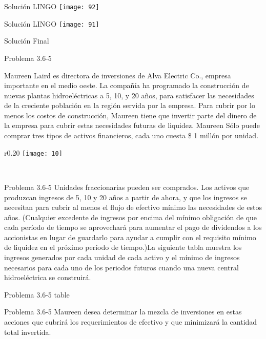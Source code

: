 \documentclass{beamer}
\begin{document}
\begin{frame}[fragile]{Solución LINGO}
    \texttt{[image: 92]}
\end{frame}
\begin{frame}[fragile]{Solución LINGO}
    \texttt{[image: 91]}
\end{frame}

\begin{frame}[fragile]{Solución Final}
\end{frame}

\begin{frame}[t,fragile]{Problema 3.6-5 }

Maureen Laird es directora de inversiones de Alva Electric Co., empresa importante en el medio oeste. La compañía ha programado la construcción de nuevas plantas hidroeléctricas a 5, 10, y 20 años, para satisfacer las necesidades de la creciente población en la región servida por la empresa. Para cubrir por lo menos los costos de construcción, Maureen tiene que invertir parte del dinero de  la empresa para cubrir estas necesidades futuras de liquidez. Maureen Sólo puede comprar tres tipos de activos financieros, cada uno  cuesta \$ 1 millón por unidad.
 \begin{wrapfigure}{r}{0.20\textwidth}
    \centering
    \texttt{[image: 10]}
\end{wrapfigure}\\

\end{frame}
\begin{frame}[t,fragile]{Problema 3.6-5 }
Unidades fraccionarias pueden ser comprados. Los activos que produzcan ingresos de 5, 10 y 20 años a partir de ahora, y que los ingresos se necesitan para cubrir al menos el flujo de efectivo mínimo las necesidades de estos años. (Cualquier excedente de ingresos por encima del mínimo obligación de que cada período de tiempo se aprovechará para aumentar el pago de dividendos a los accionistas en lugar de guardarlo para ayudar a cumplir con el requisito mínimo de liquidez en el próximo período de tiempo.)La siguiente tabla muestra  los ingresos generados por cada unidad de cada activo y el  mínimo de ingresos necesarios para cada uno de los periodos futuros cuando una nueva central hidroeléctrica se construirá.
\end{frame}
\begin{frame}[t,fragile]{Problema 3.6-5 }
table
\end{frame}
\begin{frame}[t,fragile]{Problema 3.6-5 }
Maureen desea determinar la mezcla de inversiones en estas acciones que cubrirá los requerimientos de efectivo y que minimizará la cantidad total invertida.
\end{frame}
\end{document}
